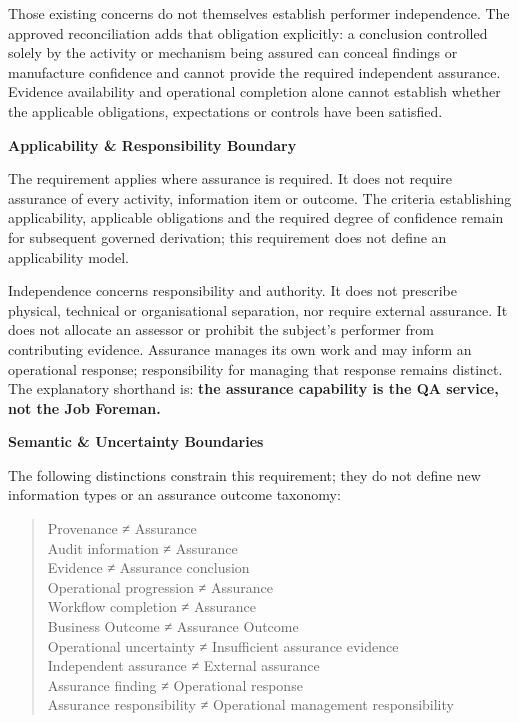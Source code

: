 Those existing concerns do not themselves establish performer independence. The approved reconciliation adds that obligation explicitly: a conclusion controlled solely by the activity or mechanism being assured can conceal findings or manufacture confidence and cannot provide the required independent assurance. Evidence availability and operational completion alone cannot establish whether the applicable obligations, expectations or controls have been satisfied.



\par\medskip\textbf{Applicability \& Responsibility Boundary}\par


The requirement applies where assurance is required. It does not require assurance of every activity, information item or outcome. The criteria establishing applicability, applicable obligations and the required degree of confidence remain for subsequent governed derivation; this requirement does not define an applicability model.



Independence concerns responsibility and authority. It does not prescribe physical, technical or organisational separation, nor require external assurance. It does not allocate an assessor or prohibit the subject's performer from contributing evidence. Assurance manages its own work and may inform an operational response; responsibility for managing that response remains distinct. The explanatory shorthand is: \textbf{the assurance capability is the QA service, not the Job Foreman.}



\par\medskip\textbf{Semantic \& Uncertainty Boundaries}\par


The following distinctions constrain this requirement; they do not define new information types or an assurance outcome taxonomy:



\begin{quote}\small\ttfamily
Provenance ≠ Assurance\\
Audit information ≠ Assurance\\
Evidence ≠ Assurance conclusion\\
Operational progression ≠ Assurance\\
Workflow completion ≠ Assurance\\
Business Outcome ≠ Assurance Outcome\\
Operational uncertainty ≠ Insufficient assurance evidence\\
Independent assurance ≠ External assurance\\
Assurance finding ≠ Operational response\\
Assurance responsibility ≠ Operational management responsibility\\

\end{quote}


